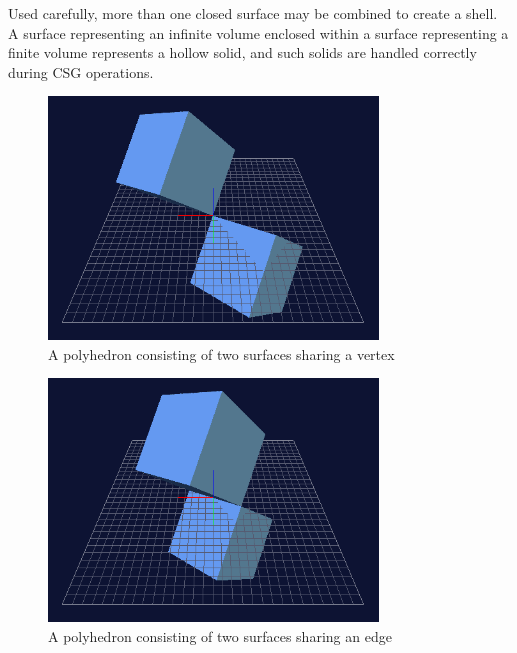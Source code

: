 \documentclass{carve}
\begin{document}
Used carefully, more than one closed surface may be combined to create
a shell. A surface representing an infinite volume enclosed within a
surface representing a finite volume represents a hollow solid, and
such solids are handled correctly during CSG operations.

\begin{figure}
  \begin{center}\includegraphics[width=3.453in]{polyhedra/shared-vertex.tif}\end{center}
  \caption{A polyhedron consisting of two surfaces sharing a vertex}
  \label{fig:polyhedron-shared-vertex}
\end{figure}

\begin{figure}
  \begin{center}\includegraphics[width=3.453in]{polyhedra/shared-edge.tif}\end{center}
  \caption{A polyhedron consisting of two surfaces sharing an edge}
  \label{fig:polyhedron-shared-edge}
\end{figure}
\end{document}
